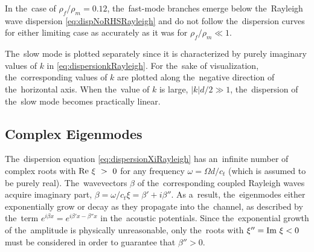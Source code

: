 In the~case of $\rho_f/\rho_m = 0.12$, the~fast-mode branches emerge below the~Rayleigh wave dispersion \cref{eq:dispNoRHSRayleigh} and do not follow the~dispersion curves for either limiting case as accurately as it was for $\rho_f/\rho_m \ll 1$.


The~slow mode is plotted separately since it is characterized by purely imaginary values of $k$ in \cref{eq:dispersionkRayleigh}.
For the~sake of visualization, the~corresponding values of $k$ are plotted along the~negative direction of the~horizontal axis.
When the~value of $k$ is large, $|k|d/2 \gg 1$, the~dispersion of the~slow mode becomes practically linear.


\subsection{Complex Eigenmodes}

The~dispersion equation \cref{eq:dispersionXiRayleigh} has an~infinite number of complex roots with $\textrm{Re }\xi~>~0$ for any frequency $\omega=\Omega d/c_t$ (which is assumed to be purely real).
The~wavevectors $\beta$ of the~corresponding coupled Rayleigh waves acquire imaginary part, $\beta = \omega/c_t\xi = \beta'+i\beta''$.
As a~result, the~eigenmodes either exponentially grow or decay as they propagate into the~channel, as described by the~term $e^{i\beta x}=e^{i\beta'x-\beta''x}$ in the~acoustic potentials.
Since the~exponential growth of the~amplitude is physically unreasonable, only the~roots with $\xi''=\textrm{Im } \xi < 0$ must be considered in order to guarantee that $\beta'' > 0$.

